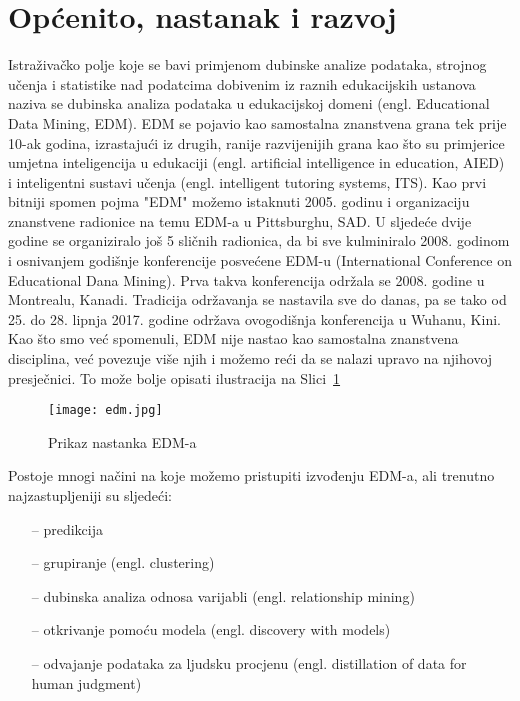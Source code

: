 \documentclass[times, utf8, zavrsni, numeric]{fer}
\begin{document}
\section{Općenito, nastanak i razvoj}
Istraživačko polje koje se bavi primjenom dubinske analize podataka, strojnog učenja i statistike nad podatcima dobivenim iz raznih edukacijskih ustanova naziva se dubinska analiza podataka u edukacijskoj domeni (engl. Educational Data Mining, EDM). EDM se pojavio kao samostalna znanstvena grana tek prije 10-ak godina, izrastajući iz drugih, ranije razvijenijih grana kao što su primjerice umjetna inteligencija u edukaciji (engl. artificial intelligence in education, AIED) i inteligentni sustavi učenja (engl. intelligent tutoring systems, ITS). Kao prvi bitniji spomen pojma "EDM" možemo istaknuti 2005. godinu i organizaciju znanstvene radionice na temu EDM-a u Pittsburghu, SAD. U sljedeće dvije godine se organiziralo još 5 sličnih radionica, da bi sve kulminiralo 2008. godinom i osnivanjem godišnje konferencije posvećene EDM-u (International Conference on Educational Dana Mining). Prva takva konferencija održala se 2008. godine u Montrealu, Kanadi. Tradicija održavanja se nastavila sve do danas, pa se tako od 25. do 28. lipnja 2017. godine održava ovogodišnja konferencija u Wuhanu, Kini.
Kao što smo već spomenuli, EDM nije nastao kao samostalna znanstvena disciplina, već povezuje više njih i možemo reći da se nalazi upravo na njihovoj presječnici. To može bolje opisati ilustracija na Slici~\ref{fig:edm}
\begin{figure}[H]
\centering
\texttt{[image: edm.jpg]}
\caption{Prikaz nastanka EDM-a\cite{ungar2002uvod}}
\label{fig:edm}
\end{figure}
Postoje mnogi načini na koje možemo pristupiti izvođenju EDM-a, ali trenutno najzastupljeniji su sljedeći\cite{edm1}\cite{baker2010data}\cite{WIDM:WIDM1075}:
\begin{itemize}
\item[--] predikcija
\item[--] grupiranje (engl. clustering)
\item[--] dubinska analiza odnosa varijabli (engl. relationship mining)
\item[--] otkrivanje pomoću modela (engl. discovery with models)
\item[--] odvajanje podataka za ljudsku procjenu (engl. distillation of data for human judgment)
\end{itemize}
\end{document}
